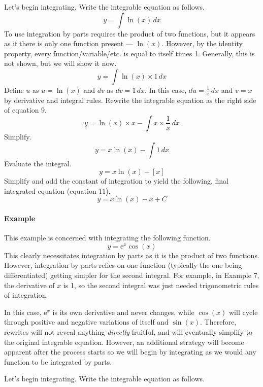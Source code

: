 \documentclass{article}
\newcounter{example}%
\newcommand{\ex}{\stepcounter{example} \paragraph{Example \theexample}}
\begin{document}
Let's begin integrating. Write the integrable equation as follows.
\begin{equation*}
    y=\int \ln(x)\, dx
\end{equation*}
To use integration by parts requires the product of two functions, but it appears as if there is only one function present --- $\ln(x)$. However, by the identity property, every function/variable/etc. is equal to itself times 1. Generally, this is not shown, but we will show it now.
\begin{equation*}
    y=\int \ln(x)\times 1\, dx
\end{equation*}
Define $u$ as $u=\ln(x)$ and $dv$ as $dv=1\, dx$. In this case, $du=\tfrac{1}{x}\, dx$ and $v=x$ by derivative and integral rules. Rewrite the integrable equation as the right side of equation 9.
\begin{equation*}
    y= \ln(x)\times x-\int x\times \frac{1}{x}\, dx
\end{equation*}
Simplify.
\begin{equation*}
    y= x\ln(x)-\int 1\, dx
\end{equation*}
Evaluate the integral.
\begin{equation*}
    y= x\ln(x)-[x]
\end{equation*}
Simplify and add the constant of integration to yield the following, final integrated equation (equation 11).
\begin{equation}
    y= x\ln(x)-x+C
\end{equation}
\ex This example is concerned with integrating the following function.$$y=\text{e}^x\cos(x)$$
This clearly necessitates integration by parts as it is the product of two functions. However, integration by parts relies on one function (typically the one being differentiated) getting simpler for the second integral. For example, in Example 7, the derivative of $x$ is 1, so the second integral was just needed trigonometric rules of integration.\par
In this case, $\text{e}^x$ is its own derivative and never changes, while $\cos(x)$ will cycle through positive and negative variations of itself and $\sin(x)$. Therefore, rewrites will not reveal anything \emph{directly} fruitful, and will eventually simplify to the original integrable equation. However, an additional strategy will become apparent after the process starts so we will begin by integrating as we would any function to be integrated by parts.\par
Let's begin integrating. Write the integrable equation as follows.
\end{document}
